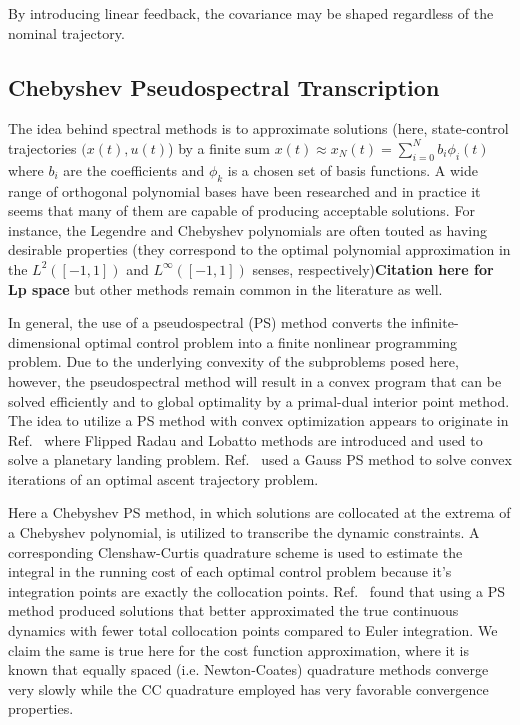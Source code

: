 \documentclass[10pt,a4paper]{article}
\begin{document}
	

	
	By introducing linear feedback, the covariance may be shaped regardless of the nominal trajectory. 
		
		
		
	

	
	\subsection{Chebyshev Pseudospectral Transcription}
	The idea behind spectral methods is to approximate solutions (here, state-control trajectories $ (x(t),u(t) $) by a finite sum $x(t) \approx x_N(t) = \sum_{i=0}^{N}b_i\phi_i(t)$ where $b_i$ are the coefficients and $ {\phi_k} $ is a chosen set of basis functions. A wide range of orthogonal polynomial bases have been researched \cite{ChebyPS,LegendrePS,RadauPS,GPOPS} and in practice it seems that many of them are capable of producing acceptable solutions. For instance, the Legendre and Chebyshev polynomials are often touted as having desirable properties (they correspond to the optimal polynomial approximation in the $L^2([-1,1])$ and $L^\infty([-1,1])$ senses, respectively)\textbf{Citation here for Lp space} but other methods remain common in the literature as well.
	
	In general, the use of a pseudospectral (PS) method converts the infinite-dimensional optimal control problem into a finite nonlinear programming problem. Due to the underlying convexity of the subproblems posed here, however, the pseudospectral method will result in a convex program that can be solved efficiently and to global optimality by a primal-dual interior point method. The idea to utilize a PS method with convex optimization appears to originate in Ref.~\cite{PS_Convex} where Flipped Radau and Lobatto methods are introduced and used to solve a planetary landing problem. Ref.~\cite{PS_Convex_ascent} used a Gauss PS method to solve convex iterations of an optimal ascent trajectory problem. 
	
	Here a Chebyshev PS method, in which solutions are collocated at the extrema of a Chebyshev polynomial, is utilized to transcribe the dynamic constraints. A corresponding Clenshaw-Curtis quadrature scheme is used to estimate the integral in the running cost of each optimal control problem because it's integration points are exactly the collocation points.\cite{CCQuad} Ref.~\cite{PS_Convex} found that using a PS method produced solutions that better approximated the true continuous dynamics with fewer total collocation points compared to Euler integration. We claim the same is true here for the cost function approximation, where it is known that equally spaced (i.e. Newton-Coates) quadrature methods converge very slowly while the CC quadrature employed has very favorable convergence properties.
	
\end{document}
